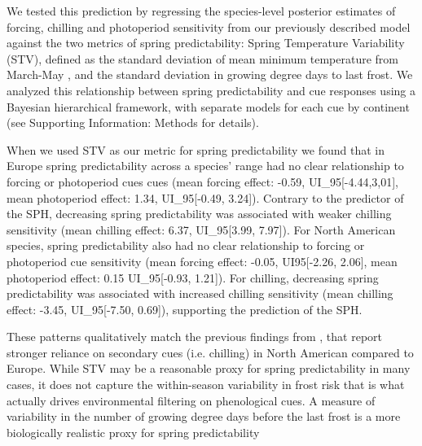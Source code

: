 \documentclass[12pt]{article}
\begin{document}
We tested this prediction by regressing the species-level posterior estimates of forcing, chilling and photoperiod sensitivity from our previously described model against the two metrics of spring predictability: Spring Temperature Variability (STV), defined as the standard deviation of mean minimum temperature from March-May \citep[See Supporting Information Methods]{Zohner:2017aa}, and the standard deviation in growing degree days to last frost. We analyzed this relationship between spring predictability and cue responses using a Bayesian hierarchical framework, with separate models for each cue by continent (see Supporting Information: Methods for details). 

When we used STV as our metric for spring predictability we found that in Europe spring predictability across a species' range had no clear relationship to forcing or photoperiod cues cues (mean forcing effect: -0.59, UI_{95}[-4.44,3,01], mean photoperiod effect: 1.34, UI_{95}[-0.49, 3.24]). Contrary to the predictor of the SPH, decreasing spring predictability was associated with weaker chilling sensitivity (mean chilling effect: 6.37, UI_{95}[3.99, 7.97]). For North American species, spring predictability also had no clear relationship to forcing or photoperiod cue sensitivity (mean forcing effect: -0.05, UI{95}[-2.26, 2.06], mean photoperiod effect: 0.15 UI_{95}[-0.93, 1.21]). For chilling, decreasing spring predictability was associated with increased chilling sensitivity (mean chilling effect: -3.45, UI_{95}[-7.50, 0.69]), supporting the prediction of the SPH.

These patterns qualitatively match the previous findings from \citet{Zohner:2017aa}, that report stronger reliance on secondary cues (i.e. chilling) in North American compared to Europe. While STV may be a reasonable proxy for spring predictability in many cases, it does not capture the within-season variability in frost risk that is what actually drives environmental filtering on phenological cues. A measure of variability in the number of growing degree days before the last frost is a more biologically realistic proxy for spring predictability %
\end{document}
